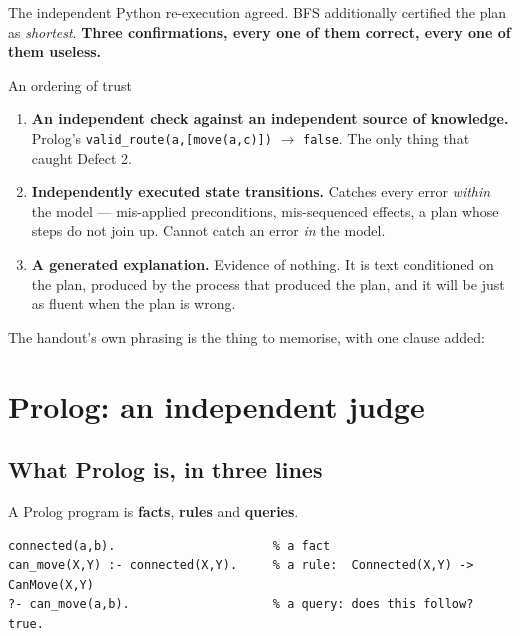 \documentclass[11pt,a4paper]{article}
\begin{document}
The independent Python re-execution agreed. BFS additionally certified the plan
as \emph{shortest}. \textbf{Three confirmations, every one of them correct,
every one of them useless.}

\begin{keyidea}{An ordering of trust}
\begin{enumerate}
  \item \textbf{An independent check against an independent source of
        knowledge.} Prolog's \texttt{valid\_route(a,[move(a,c)])} $\to$
        \texttt{false}. The only thing that caught Defect 2.
  \item \textbf{Independently executed state transitions.} Catches every error
        \emph{within} the model --- mis-applied preconditions, mis-sequenced
        effects, a plan whose steps do not join up. Cannot catch an error
        \emph{in} the model.
  \item \textbf{A generated explanation.} Evidence of nothing. It is text
        conditioned on the plan, produced by the process that produced the plan,
        and it will be just as fluent when the plan is wrong.
\end{enumerate}
\end{keyidea}

The handout's own phrasing is the thing to memorise, with one clause added:

\begin{center}
\end{center}

\section{Prolog: an independent judge}

\subsection{What Prolog is, in three lines}

A Prolog program is \textbf{facts}, \textbf{rules} and \textbf{queries}.

\begin{lstlisting}
connected(a,b).                      % a fact
can_move(X,Y) :- connected(X,Y).     % a rule:  Connected(X,Y) -> CanMove(X,Y)
?- can_move(a,b).                    % a query: does this follow?
true.
\end{lstlisting}
\end{document}
